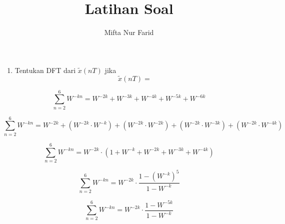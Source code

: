 \documentclass{article}
\begin{document}
\title{Latihan Soal}

\author{Mifta Nur Farid}

\maketitle

\begin{enumerate}
    \item Tentukan DFT dari $\tilde{x}(nT)$ jika
    \begin{equation*}
        \tilde{x}(nT) = 
    \end{equation*}
\end{enumerate}

\begin{equation}
    \sum_{n=2}^6 W^{-kn} = W^{-2k} + W^{-3k} + W^{-4k} + W^{-5k} + W^{-6k}
\end{equation}

\begin{equation}
    \sum_{n=2}^6 W^{-kn} = W^{-2k} + (W^{-2k} \cdot W^{-k}) + (W^{-2k} \cdot W^{-2k}) + (W^{-2k} \cdot W^{-3k}) + (W^{-2k} \cdot W^{-4k})
\end{equation}

\begin{equation}
    \sum_{n=2}^6 W^{-kn} = W^{-2k} \cdot (1 + W^{-k} + W^{-2k} + W^{-3k} + W^{-4k})
\end{equation}

\begin{equation}
    \sum_{n=2}^6 W^{-kn} = W^{-2k} \cdot \frac{1 - (W^{-k})^5}{1 - W^{-k}}
\end{equation}

\begin{equation}
    \sum_{n=2}^6 W^{-kn} = W^{-2k} \cdot \frac{1 - W^{-5k}}{1 - W^{-k}}
\end{equation}
\end{document}

